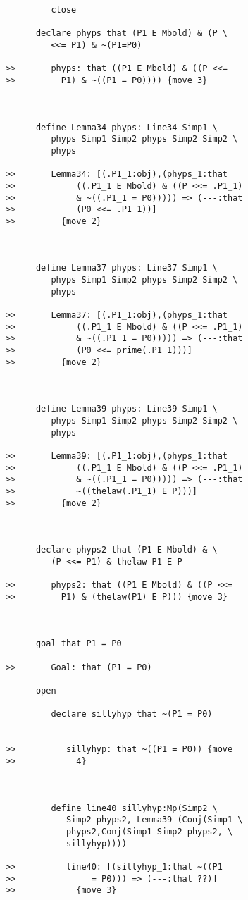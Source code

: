 \documentclass[12pt]{article}
\begin{document}
\begin{verbatim}
         close

      declare phyps that (P1 E Mbold) & (P \
         <<= P1) & ~(P1=P0)

>>       phyps: that ((P1 E Mbold) & ((P <<=
>>         P1) & ~((P1 = P0)))) {move 3}



      define Lemma34 phyps: Line34 Simp1 \
         phyps Simp1 Simp2 phyps Simp2 Simp2 \
         phyps

>>       Lemma34: [(.P1_1:obj),(phyps_1:that
>>            ((.P1_1 E Mbold) & ((P <<= .P1_1)
>>            & ~((.P1_1 = P0))))) => (---:that
>>            (P0 <<= .P1_1))]
>>         {move 2}



      define Lemma37 phyps: Line37 Simp1 \
         phyps Simp1 Simp2 phyps Simp2 Simp2 \
         phyps

>>       Lemma37: [(.P1_1:obj),(phyps_1:that
>>            ((.P1_1 E Mbold) & ((P <<= .P1_1)
>>            & ~((.P1_1 = P0))))) => (---:that
>>            (P0 <<= prime(.P1_1)))]
>>         {move 2}



      define Lemma39 phyps: Line39 Simp1 \
         phyps Simp1 Simp2 phyps Simp2 Simp2 \
         phyps

>>       Lemma39: [(.P1_1:obj),(phyps_1:that
>>            ((.P1_1 E Mbold) & ((P <<= .P1_1)
>>            & ~((.P1_1 = P0))))) => (---:that
>>            ~((thelaw(.P1_1) E P)))]
>>         {move 2}



      declare phyps2 that (P1 E Mbold) & \
         (P <<= P1) & thelaw P1 E P

>>       phyps2: that ((P1 E Mbold) & ((P <<=
>>         P1) & (thelaw(P1) E P))) {move 3}



      goal that P1 = P0

>>       Goal: that (P1 = P0)

      open

         declare sillyhyp that ~(P1 = P0)


>>          sillyhyp: that ~((P1 = P0)) {move
>>            4}



         define line40 sillyhyp:Mp(Simp2 \
            Simp2 phyps2, Lemma39 (Conj(Simp1 \
            phyps2,Conj(Simp1 Simp2 phyps2, \
            sillyhyp))))

>>          line40: [(sillyhyp_1:that ~((P1
>>               = P0))) => (---:that ??)]
>>            {move 3}




\end{verbatim}
\end{document}
